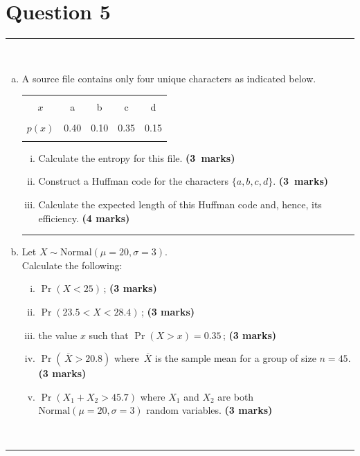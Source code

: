 \documentclass[12pt]{article}
\begin{document}
\section*{Question 5 }
\noindent\rule{\linewidth}{1pt}
\quad\\[-0.5cm]
\begin{enumerate}[a)]
\item A source file contains only four unique characters as indicated below.\quad
\begin{center}
\begin{tabular}{|c|cccc|}
\hline
&&&&\\[-0.4cm]
$x$        & a & b & c & d \\
\hline
&&&&\\[-0.4cm]
$p(x)$ & 0.40 & 0.10 & 0.35 & 0.15 \\
\hline
\multicolumn{5}{c}{}
\end{tabular}
\end{center}
    \begin{enumerate}[i)]\itemsep0.3cm
    \item Calculate the entropy for this file. \hfill{\mbox{\scriptsize \bf (3 marks)}}
    \item Construct a Huffman code for the characters $\{a,b,c,d\}$. \hfill{\mbox{\scriptsize \bf (3 marks)}}
    \item Calculate the expected length of this Huffman code and, hence, its efficiency. \hfill{\scriptsize \bf (4 marks)}
    \end{enumerate}
\begin{center}\noindent\rule{0.4\linewidth}{0.5pt}\end{center}
\item Let $X \sim \text{Normal}(\mu = 20, \sigma = 3)$.\\[0.3cm]
    Calculate the following:
    \begin{enumerate}[i)]\itemsep0.3cm
    \item $\Pr(X < 25)$\,; \hfill{\scriptsize \bf (3 marks)}
    \item $\Pr(23.5 < X < 28.4)$\,; \hfill{\scriptsize \bf (3 marks)}
    \item the value $x$ such that $\Pr(X > x) = 0.35$\,; \hfill{\scriptsize \bf (3 marks)}
    \item $\Pr(\,\overline{\!X} > 20.8)$ where $\,\overline{\!X}$ is the sample mean for a group of size $n=45$.\\
        \phantom{a}\hfill{\scriptsize \bf (3 marks)}
    \item $\Pr(X_1 + X_2 > 45.7)$ where $X_1$ and $X_2$ are both $\text{Normal}(\mu = 20, \sigma = 3)$ random variables. \hfill{\scriptsize \bf (3 marks)}
    \end{enumerate}
\end{enumerate}
\quad\\[-0.3cm]
\noindent\rule{\linewidth}{1pt}
\end{document}
